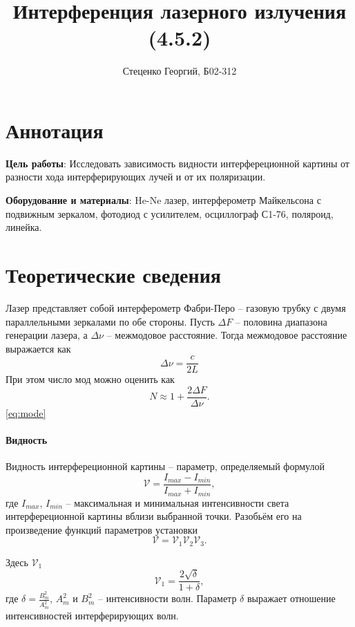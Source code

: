 \documentclass[12pt, a4paper]{article}
\title{Интерференция лазерного излучения (4.5.2)}
\author{Стеценко Георгий, Б02-312}
\date{}
\newcommand{\V}{\mathcal{V}}
\begin{document}
\maketitle

\section{Аннотация}
\sloppy \textbf{Цель работы}: Исследовать зависимость видности интерфереционной
картины от разности хода интерферирующих лучей и от их поляризации.

\textbf{Оборудование и материалы}: He-Ne лазер, интерферометр Майкельсона с
подвижным зеркалом, фотодиод с усилителем, осциллограф С1-76, поляроид,
линейка.

\section{Теоретические сведения}
Лазер представляет собой интерферометр Фабри-Перо -- газовую трубку с двумя
параллельными зеркалами по обе стороны. Пусть $\Delta F$ -- половина диапазона
генерации лазера, а $\Delta \nu$ -- межмодовое расстояние. Тогда межмодовое
расстояние выражается как
\begin{equation}
    \Delta \nu = \dfrac{c}{2L}
\end{equation}
При этом число мод можно оценить как
\begin{equation}
    N \approx 1 + \dfrac{2\Delta F}{\Delta \nu}.
    \label{eq:mode}
\end{equation}
\eqref{eq:mode}
\paragraph*{Видность}
Видность интерфереционной картины -- параметр, определяемый формулой
\begin{equation}
    \V = \dfrac{I_{max} - I_{min}}{I_{max} + I_{min}},
\end{equation}
где $I_{max}$, $I_{min}$ -- максимальная и минимальная интенсивности света интерфереционной картины вблизи выбранной точки. Разобьём его на произведение функций параметров установки
$$
    \V = \V_1 \V_2 \V_3.
$$

Здесь $\V_1$
\begin{equation}
    \V_1 = \dfrac{2\sqrt{\delta}}{1+\delta},
\end{equation}
где $\delta = \frac{B_m^2}{A_m^2}$, $A_m^2$ и $B_m^2$ -- интенсивности волн. Параметр $\delta$ выражает отношение интенсивностей интерферирующих волн.\\
\end{document}
